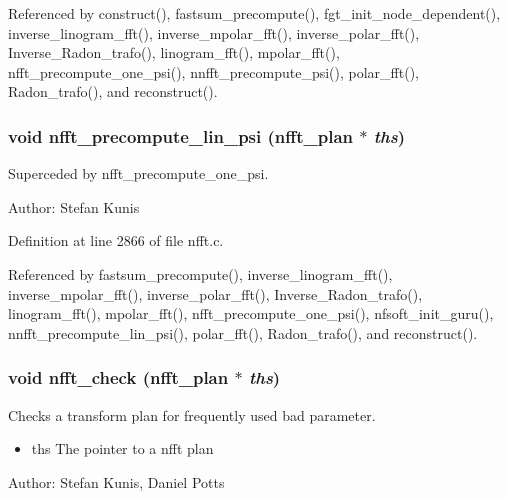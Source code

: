 Referenced by construct(), fastsum\_\-precompute(), fgt\_\-init\_\-node\_\-dependent(), inverse\_\-linogram\_\-fft(), inverse\_\-mpolar\_\-fft(), inverse\_\-polar\_\-fft(), Inverse\_\-Radon\_\-trafo(), linogram\_\-fft(), mpolar\_\-fft(), nfft\_\-precompute\_\-one\_\-psi(), nnfft\_\-precompute\_\-psi(), polar\_\-fft(), Radon\_\-trafo(), and reconstruct().\hypertarget{group__nfft_g3f91a7a005cc31a8b05f33fea0507ddc}{
\subsubsection{\setlength{\rightskip}{0pt plus 5cm}void nfft\_\-precompute\_\-lin\_\-psi ({\bf nfft\_\-plan} $\ast$ {\em ths})}}
\label{group__nfft_g3f91a7a005cc31a8b05f33fea0507ddc}


Superceded by nfft\_\-precompute\_\-one\_\-psi. 

\begin{Desc}
\item[Author:]Stefan Kunis \end{Desc}


Definition at line 2866 of file nfft.c.

Referenced by fastsum\_\-precompute(), inverse\_\-linogram\_\-fft(), inverse\_\-mpolar\_\-fft(), inverse\_\-polar\_\-fft(), Inverse\_\-Radon\_\-trafo(), linogram\_\-fft(), mpolar\_\-fft(), nfft\_\-precompute\_\-one\_\-psi(), nfsoft\_\-init\_\-guru(), nnfft\_\-precompute\_\-lin\_\-psi(), polar\_\-fft(), Radon\_\-trafo(), and reconstruct().\hypertarget{group__nfft_g7af648ae0503976536b8db18200f99fe}{
\subsubsection{\setlength{\rightskip}{0pt plus 5cm}void nfft\_\-check ({\bf nfft\_\-plan} $\ast$ {\em ths})}}
\label{group__nfft_g7af648ae0503976536b8db18200f99fe}


Checks a transform plan for frequently used bad parameter. 

\begin{itemize}
\item ths The pointer to a nfft plan\end{itemize}
\begin{Desc}
\item[Author:]Stefan Kunis, Daniel Potts \end{Desc}


